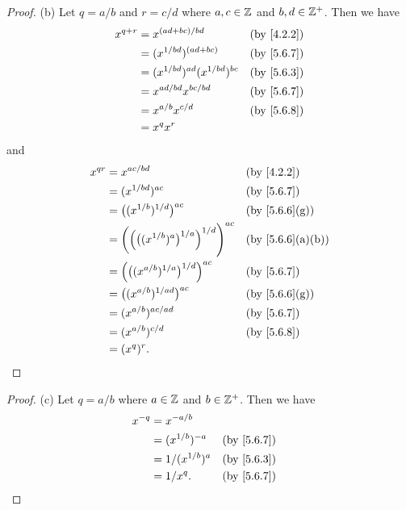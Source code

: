 \begin{proof}{(b)}
  Let \(q = a / b\) and \(r = c / d\) where \(a, c \in \mathbb{Z}\) and \(b, d \in \mathbb{Z}^+\).
  Then we have
  \begin{align*}
    x^{q + r} & = x^{(ad + bc) / bd}                  &  & \by{4.2.2}                \\
              & = (x^{1 / bd})^{(ad + bc)}            &  & \by{5.6.7}                \\
              & = (x^{1 / bd})^{ad} (x^{1 / bd})^{bc} &  & \by{5.6.3}                \\
              & = x^{ad / bd} x^{bc / bd}             &  & \text{(by  \cref{5.6.7})} \\
              & = x^{a / b} x^{c / d}                 &  & \by{5.6.8}                \\
              & = x^q x^r
  \end{align*}
  and
  \begin{align*}
    x^{qr} & = x^{ac / bd}                                                        &  & \by{4.2.2}      \\
           & = (x^{1 / bd})^{ac}                                                  &  & \by{5.6.7}      \\
           & = \big((x^{1 / b})^{1 / d}\big)^{ac}                                 &  & \by{5.6.6}[g]   \\
           & = \bigg(\Big(\big((x^{1 / b})^a\big)^{1 / a}\Big)^{1 / d}\Bigg)^{ac} &  & \by{5.6.6}[a,b] \\
           & = \Big(\big((x^{a / b})^{1 / a}\big)^{1 / d}\Big)^{ac}               &  & \by{5.6.7}      \\
           & = \big((x^{a / b})^{1 / ad}\big)^{ac}                                &  & \by{5.6.6}[g]   \\
           & = (x^{a / b})^{ac / ad}                                              &  & \by{5.6.7}      \\
           & = (x^{a / b})^{c / d}                                                &  & \by{5.6.8}      \\
           & = (x^q)^r.
  \end{align*}
\end{proof}

\begin{proof}{(c)}
  Let \(q = a / b\) where \(a \in \mathbb{Z}\) and \(b \in \mathbb{Z}^+\).
  Then we have
  \begin{align*}
    x^{-q} & = x^{-a / b}                        \\
           & = (x^{1 / b})^{-a}  &  & \by{5.6.7} \\
           & = 1 / (x^{1 / b})^a &  & \by{5.6.3} \\
           & = 1 / x^q.          &  & \by{5.6.7}
  \end{align*}
\end{proof}

